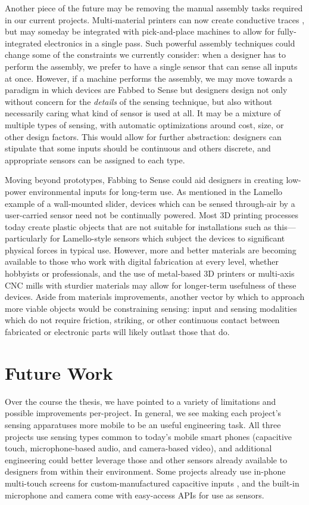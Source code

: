 Another piece of the future may be removing the manual assembly tasks required in our current projects. Multi-material printers can now create conductive traces \cite{voxel8}, but may someday be integrated with pick-and-place machines to allow for fully-integrated electronics in a single pass. Such powerful assembly techniques could change some of the constraints we currently consider: when a designer has to perform the assembly, we prefer to have a single sensor that can sense all inputs at once. However, if a machine performs the assembly, we may move towards a paradigm in which devices are Fabbed to Sense but designers design not only without concern for the \emph{details} of the sensing technique, but also without necessarily caring what kind of sensor is used at all. It may be a mixture of multiple types of sensing, with automatic optimizations around cost, size, or other design factors. This would allow for further abstraction: designers can stipulate that some inputs should be continuous and others discrete, and appropriate sensors can be assigned to each type.

Moving beyond prototypes, Fabbing to Sense could aid designers in creating low-power environmental inputs for long-term use. As mentioned in the Lamello example of a wall-mounted slider, devices which can be sensed through-air by a user-carried sensor need not be continually powered. Most 3D printing processes today create plastic objects that are not suitable for installations such as this---particularly for Lamello-style sensors which subject the devices to significant physical forces in typical use. However, more and better materials are becoming available to those who work with digital fabrication at every level, whether hobbyists or professionals, and the use of metal-based 3D printers or multi-axis CNC mills with sturdier materials may allow for longer-term usefulness of these devices. Aside from materials improvements, another vector by which to approach more viable objects would be constraining sensing: input and sensing modalities which do not require friction, striking, or other continuous contact between fabricated or electronic parts will likely outlast those that do.

\section{Future Work}

Over the course the thesis, we have pointed to a variety of limitations and possible improvements per-project. In general, we see making each project's sensing apparatuses more mobile to be an useful engineering task. All three projects use sensing types common to today's mobile smart phones (capacitive touch, microphone-based audio, and camera-based video), and additional engineering could better leverage those and other sensors already available to designers from within their environment. Some projects already use in-phone multi-touch screens for custom-manufactured capacitive inputs \cite{chan-capstones,chang-clipon}, and the built-in microphone and camera come with easy-access APIs for use as sensors.

